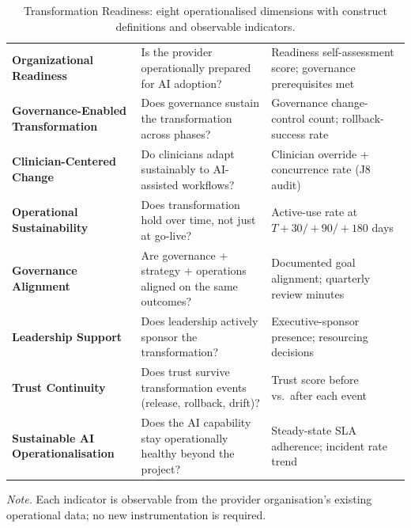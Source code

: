 {\tablestripes\tablefontsize
{}
\begin{xltabular}{\textwidth}{@{} >{\raggedright\arraybackslash}p{3.6cm} p{5.7cm} >{\raggedright\arraybackslash}p{5.0cm} @{}}
\caption[Transformation Readiness --- Eight Dimensions]{Transformation Readiness: eight operationalised dimensions with construct definitions and observable indicators.}\label{tab:appk_transformation_dims} \\
\toprule
{} &  &  \\
\midrule
\endfirsthead
\endhead
\bottomrule
\endlastfoot
\textbf{Organizational Readiness}        & Is the provider operationally prepared for AI adoption?               & Readiness self-assessment score; governance prerequisites met \\
\textbf{Governance-Enabled Transformation} & Does governance sustain the transformation across phases?            & Governance change-control count; rollback-success rate \\
\textbf{Clinician-Centered Change}        & Do clinicians adapt sustainably to AI-assisted workflows?            & Clinician override + concurrence rate (J8 audit) \\
\textbf{Operational Sustainability}      & Does transformation hold over time, not just at go-live?              & Active-use rate at $T+30 / +90 / +180$ days \\
\textbf{Governance Alignment}             & Are governance + strategy + operations aligned on the same outcomes? & Documented goal alignment; quarterly review minutes \\
\textbf{Leadership Support}               & Does leadership actively sponsor the transformation?                  & Executive-sponsor presence; resourcing decisions \\
\textbf{Trust Continuity}                 & Does trust survive transformation events (release, rollback, drift)?  & Trust score before vs.\ after each event \\
\textbf{Sustainable AI Operationalisation} & Does the AI capability stay operationally healthy beyond the project? & Steady-state SLA adherence; incident rate trend \\
\end{xltabular}}
\vspace{0.4em}
\noindent\textit{Note.} Each indicator is observable from the provider organisation's existing operational data; no new instrumentation is required.

